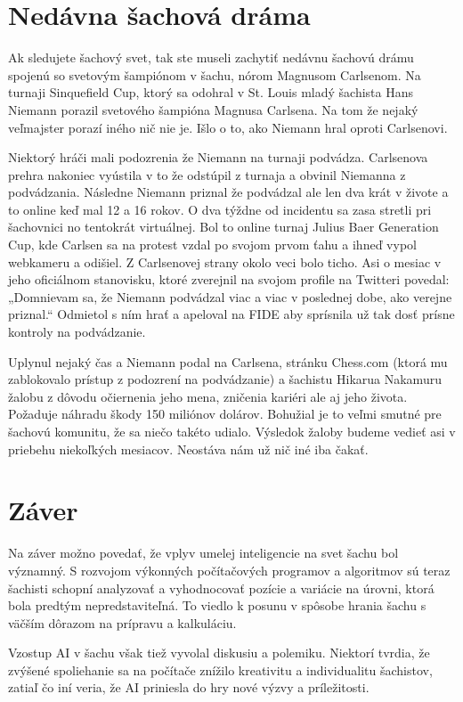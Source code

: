\documentclass[10pt,oneside,slovak,a4paper]{article}
\begin{document}
\section{Nedávna šachová dráma}

Ak sledujete šachový svet, tak ste museli zachytiť nedávnu šachovú drámu spojenú so svetovým šampiónom v šachu, nórom Magnusom Carlsenom. Na turnaji Sinquefield Cup, ktorý sa odohral v St. Louis mladý šachista Hans Niemann porazil svetového šampióna Magnusa Carlsena. Na tom že nejaký veľmajster porazí iného nič nie je. Išlo o to, ako Niemann hral oproti Carlsenovi.

Niektorý hráči mali podozrenia že Niemann na turnaji podvádza. Carlsenova prehra nakoniec vyústila v to že odstúpil z turnaja a obvinil Niemanna z podvádzania. Následne Niemann priznal že podvádzal ale len dva krát v živote a to online keď mal 12 a 16 rokov. O dva týždne od incidentu sa zasa stretli pri šachovnici no tentokrát virtuálnej. Bol to online turnaj Julius Baer Generation Cup, kde Carlsen sa na protest vzdal po svojom prvom ťahu a ihneď vypol webkameru a odišiel. Z Carlsenovej strany okolo veci bolo ticho. Asi o mesiac v jeho oficiálnom stanovisku, ktoré zverejnil na svojom profile na Twitteri povedal: „Domnievam sa, že Niemann podvádzal viac a viac v poslednej dobe, ako verejne priznal.“\cite{TWI} Odmietol s ním hrať a apeloval na FIDE aby sprísnila už tak dosť prísne kontroly na podvádzanie.

Uplynul nejaký čas a Niemann podal na Carlsena, stránku Chess.com (ktorá mu zablokovalo prístup z podozrení na podvádzanie) a šachistu Hikarua Nakamuru žalobu z dôvodu očiernenia jeho mena, zničenia kariéri ale aj jeho života. Požaduje náhradu škody 150 miliónov dolárov. Bohužial je to veľmi smutné pre šachovú komunitu, že sa niečo takéto udialo. Výsledok žaloby budeme vedieť asi v priebehu niekoľkých mesiacov. Neostáva nám už nič iné iba čakať.


\section{Záver}

Na záver možno povedať, že vplyv umelej inteligencie na svet šachu bol významný. S rozvojom výkonných počítačových programov a algoritmov sú teraz šachisti schopní analyzovať a vyhodnocovať pozície a variácie na úrovni, ktorá bola predtým nepredstaviteľná. To viedlo k posunu v spôsobe hrania šachu s väčším dôrazom na prípravu a kalkuláciu.

Vzostup AI v šachu však tiež vyvolal diskusiu a polemiku. Niektorí tvrdia, že zvýšené spoliehanie sa na počítače znížilo kreativitu a individualitu šachistov, zatiaľ čo iní veria, že AI priniesla do hry nové výzvy a príležitosti.
\end{document}
